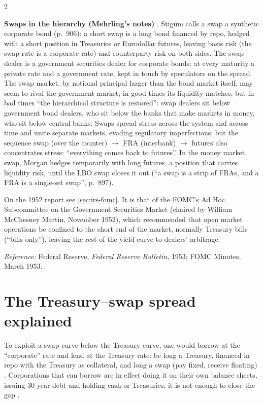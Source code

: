 \begin{paracol}{2}
\begin{keyformulas}
\textbf{Swaps in the hierarchy (Mehrling's notes)} . Stigum calls a swap a synthetic corporate bond (p.~906): a short swap is a long bond financed by repo, hedged
with a short position in Treasuries or Eurodollar futures, leaving basis risk (the swap rate is a corporate rate) and counterparty risk on both sides. The swap dealer is a government securities dealer
for corporate bonds: at every maturity a private rate and a government rate, kept in touch by speculators on the spread. The swap market, by notional principal larger than the bond market itself,
may seem to rival the government market; in good times its liquidity matches, but in bad times ``the hierarchical structure is restored'': swap dealers sit below government bond dealers, who sit
below the banks that make markets in money, who sit below central banks. Swaps spread stress across the system and across time and unite separate markets, evading regulatory imperfections; but
the sequence swap (over the counter) $\to$ FRA (interbank) $\to$ futures also concentrates stress: ``everything comes back to futures''. In the money market swap, Morgan hedges temporarily with
long futures, a position that carries liquidity risk, until the LBO swap closes it out (``a swap is a strip of FRAs, and a FRA is a single-set swap'', p.~897).
\end{keyformulas}

\begin{coursenote}
On the 1952 report see \cref{sec:irs-fomc}. It is that of the FOMC's Ad Hoc Subcommittee on the Government Securities Market (chaired by William
McChesney Martin, November 1952), which recommended that open market operations be confined to the short end of the market, normally Treasury bills
(``bills only''), leaving the rest of the yield curve to dealers' arbitrage.\par
\emph{Reference:} Federal Reserve, \emph{Federal Reserve Bulletin}, 1953; FOMC Minutes, March 1953.
\end{coursenote}

\section{The Treasury--swap spread explained}\label{sec:irs-spread}

To exploit a swap curve below the Treasury curve, one would borrow at the ``corporate'' rate and lend at the Treasury rate: be long a Treasury, financed in repo
with the Treasury as collateral, and long a swap (pay fixed, receive floating) .
Corporations that can borrow are in effect doing it on their own balance sheets, issuing 30-year debt and holding cash or Treasuries; it is not enough to close
the gap .


\end{paracol}
